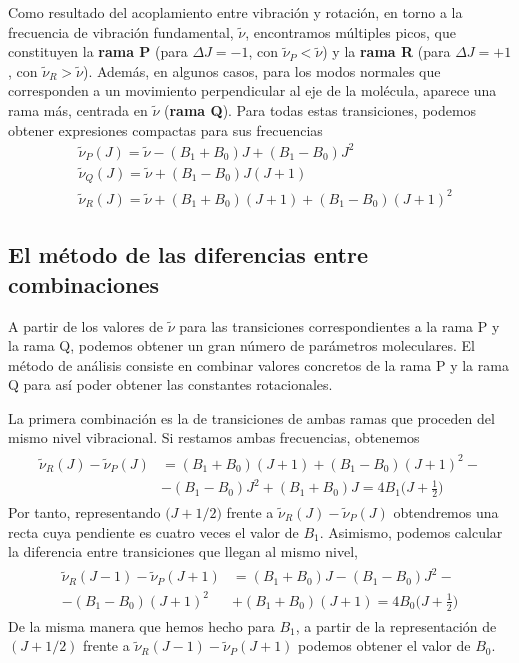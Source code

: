 \documentclass{tufte-book}
\begin{document}
Como resultado del acoplamiento entre vibración y rotación, en torno a
la frecuencia de vibración fundamental, $\tilde{\nu}$, encontramos 
múltiples picos, que constituyen la \textbf{rama P} (para $\Delta J=-1$, 
con $\tilde{\nu}_P<\tilde{\nu}$) y la \textbf{rama R} (para 
$\Delta J=+1$, con $\tilde{\nu}_R>\tilde{\nu}$). Además, en 
algunos casos, para los modos normales que corresponden a un 
movimiento perpendicular al eje de la molécula, aparece una rama 
más, centrada en $\tilde{\nu}$ (\textbf{rama Q}). Para todas estas
transiciones, podemos obtener expresiones compactas para sus 
frecuencias
\begin{align}
    &\tilde{\nu}_P(J)=\tilde{\nu} - (B_1+B_0)J + (B_1-B_0)J^2 \label{eq:nuP}\\
    &\tilde{\nu}_Q(J)=\tilde{\nu} + (B_1-B_0)J(J+1) \label{eq:nuQ}\\
    &\tilde{\nu}_R
    (J)=\tilde{\nu} + (B_1+B_0)(J+1) + (B_1-B_0)(J+1)^2 \label{eq:nuR}
\end{align}

\subsection{El método de las diferencias entre combinaciones}
A partir de los valores de $\tilde{\nu}$ para las transiciones
correspondientes a la rama P y la rama Q, podemos obtener un 
gran número de parámetros moleculares. El método de análisis
consiste en combinar valores concretos de la rama P y la
rama Q para así poder obtener las constantes rotacionales.

La primera combinación es la de transiciones de ambas ramas
que proceden del mismo nivel vibracional. Si restamos ambas
frecuencias, obtenemos
\begin{align}
\begin{split}
    \tilde{\nu}_R(J) - \tilde{\nu}_P(J)&=
    (B_1+B_0)(J+1) + (B_1-B_0)(J+1)^2 - \\
    &- (B_1-B_0)J^2 + (B_1 + B_0)J =4B_1\big(J+\frac{1}{2}\big)
\end{split}
\end{align}
Por tanto, representando $\big(J+1/2\big)$ frente a
$\tilde{\nu}_R(J) - \tilde{\nu}_P(J)$ obtendremos una
recta cuya pendiente es cuatro veces el valor de $B_1$.
Asimismo, podemos calcular la diferencia entre transiciones
que llegan al mismo nivel,
\begin{align}
    \begin{split}
    \tilde{\nu}_R(J-1) - \tilde{\nu}_P(J+1)&=
    (B_1+B_0)J - (B_1-B_0)J^2 - \\
    - (B_1-B_0)(J+1)^2 &+ (B_1 + B_0)(J+1) =4B_0\big(J+\frac{1}{2}\big)
    \end{split}
\end{align}
De la misma manera que hemos hecho para $B_1$,  a partir
de la representación de $(J+1/2)$ frente a $\tilde{\nu}_R(J-1) -
\tilde{\nu}_P(J+1)$ podemos obtener el valor de $B_0$.
\end{document}
